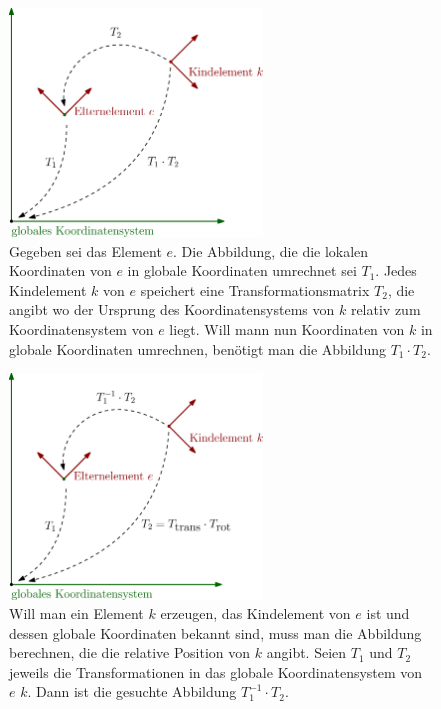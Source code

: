 \begin{figure}
 \centering
 \includegraphics[width=0.6\textwidth]{graphics/transformation_matrices.eps}
 \caption{Gegeben sei das Element $e$. Die Abbildung, die die lokalen Koordinaten von $e$ in globale Koordinaten umrechnet sei $T_1$.
 Jedes Kindelement $k$ von $e$ speichert eine Transformationsmatrix $T_2$, die angibt wo der Ursprung des Koordinatensystems von $k$ relativ zum Koordinatensystem von $e$ liegt. Will mann nun Koordinaten von $k$ in globale Koordinaten umrechnen, benötigt man die Abbildung $T_1 \cdot T_2$.}
\end{figure}

\begin{figure}
 \centering
 \includegraphics[width=0.6\textwidth]{graphics/transformation_matrices_spine.eps}
 \caption{Will man ein Element $k$ erzeugen, das Kindelement von $e$ ist und dessen globale Koordinaten bekannt sind, muss man die Abbildung berechnen, die die relative Position von $k$ angibt. Seien $T_1$ und $T_2$ jeweils die Transformationen in das globale Koordinatensystem von $e$ \bzw $k$. Dann ist die gesuchte Abbildung $T_1^{-1} \cdot T_2$.}
\end{figure}


